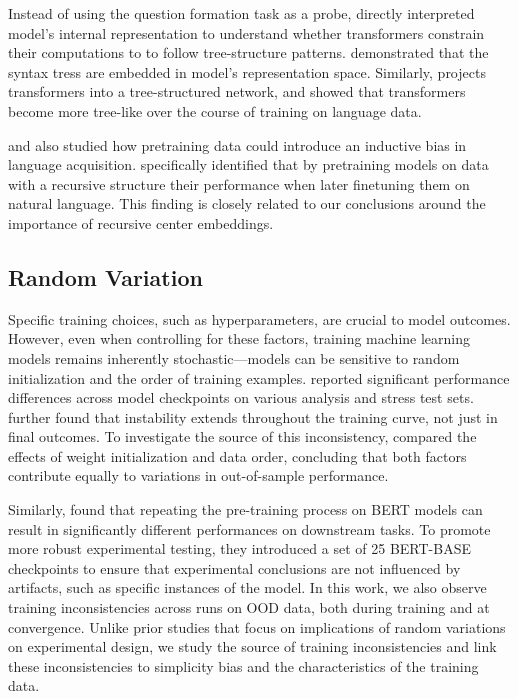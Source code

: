Instead of using the question formation task as a probe, \citet{Hewitt2019-fc, Murty2022-lw} directly interpreted model's internal representation to understand whether transformers constrain their computations to to follow tree-structure patterns. \citet{Hewitt2019-fc} demonstrated that the syntax tress are embedded in model's representation space. Similarly, \citet{Murty2022-lw} projects transformers into a tree-structured network, and showed that transformers become more tree-like over the course of training on language data. 

\citet{Papadimitriou2023-gj, Papadimitriou2020-la} and \citet{Mueller2022-rm} also studied how pretraining data could introduce an inductive bias in language acquisition. \citet{Papadimitriou2023-gj} specifically identified that by pretraining models on data with a recursive structure  their performance when later finetuning them on natural language. This finding is closely related to our conclusions around the importance of recursive center embeddings. 



\subsection{Random Variation}
Specific training choices, such as hyperparameters, are crucial to model outcomes. However, even when controlling for these factors, training machine learning models remains inherently stochastic—models can be sensitive to random initialization and the order of training examples. \citet{Zhou2020-xt, D-Amour2022-tl, Naik2018-og} reported significant performance differences across model checkpoints on various analysis and stress test sets. \citet{Zhou2020-xt} further found that instability extends throughout the training curve, not just in final outcomes. To investigate the source of this inconsistency, \citet{Dodge2020-pb} compared the effects of weight initialization and data order, concluding that both factors contribute equally to variations in out-of-sample performance.


Similarly, \citet{Sellam2021-rz} found that repeating the pre-training process on BERT models can result in significantly different performances on downstream tasks. To promote more robust experimental testing, they introduced a set of 25 BERT-BASE checkpoints to ensure that experimental conclusions are not influenced by artifacts, such as specific instances of the model. In this work, we also observe training inconsistencies across runs on OOD data, both during training and at convergence. Unlike prior studies that focus on implications of random variations on experimental design, we study the source of training inconsistencies and link these inconsistencies to simplicity bias and the characteristics of the training data.



